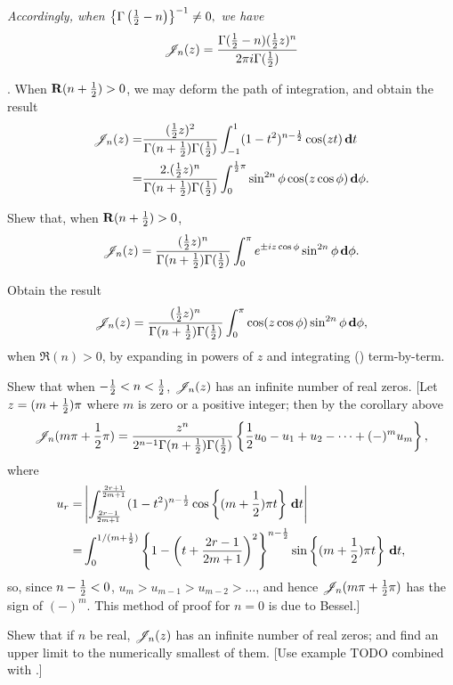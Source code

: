 \emph{Accordingly, when
  $
  \left\{ \Gamma\left( \frac{1}{2}-n \right) \right\}^{-1} \neq 0,
  $
  we have
}
$$
\mathscr{J}_{n}(z)
=
\frac{ \Gamma(\frac{1}{2}-n) (\frac{1}{2} z)^{n} }{ 2\pi i \Gamma(\frac{1}{2})}
$$

\corollary. When $\operatorname{\mathbf{R}}(n+\frac{1}{2}) > 0$, we may deform the path of
integration, and obtain the result
\begin{align*}
  \mathscr{J}_{n}(z)
  =&
  \frac{ (\frac{1}{2} z)^{2} }{ \Gamma(n+\frac{1}{2}) \Gamma(\frac{1}{2}) }
  \int_{-1}^{1} (1-t^{2})^{n-\frac{1}{2}} \cos(zt) \, \mathbf{d} t
  \\
  =&
  \frac{2 . (\frac{1}{2} z)^{n} }{ \Gamma(n+\frac{1}{2}) \Gamma(\frac{1}{2}) }
  \int_{0}^{\frac{1}{2} \pi} \sin^{2n}\phi \cos(z \cos\phi) \, \mathbf{d}\phi.
\end{align*}
\begin{wandwexample}
  Shew that, when $\operatorname{\mathbf{R}}(n+\frac{1}{2}) > 0$,
  $$
  \mathscr{J}_{n}(z)
  =
  \frac{ (\frac{1}{2} z)^{n} }{ \Gamma(n+\frac{1}{2}) \Gamma(\frac{1}{2}) }
  \int_{0}^{\pi} e^{\pm iz\cos\phi} \sin^{2n}\phi \, \mathbf{d}\phi.
  $$
\end{wandwexample}
\begin{wandwexample}
  Obtain the result
  $$
  \mathscr{J}_{n}(z)
  =
  \frac{ (\frac{1}{2} z)^{n} }{ \Gamma(n+\frac{1}{2}) \Gamma(\frac{1}{2}) }
  \int_{0}^{\pi} \cos(z\cos\phi) \sin^{2n}\phi \, \mathbf{d}\phi,
  $$
  when $\Re(n) > 0$, by expanding in powers of $z$ and
  integrating
  () term-by-term.
\end{wandwexample}
% 
% 
\begin{wandwexample}
  Shew that when $-\frac{1}{2} < n < \frac{1}{2}$, $\mathscr{J}_{n}(z)$ has an infinite number
  of real zeros. [Let $z = (m+\frac{1}{2})\pi$ where $m$ is zero or a
  positive integer; then by the corollary above
  $$
  \mathscr{J}_{n}(m\pi + \frac{1}{2}\pi)
  =
  \frac{z^{n}}{2^{n-1} \Gamma(n+\frac{1}{2}) \Gamma(\frac{1}{2})}
  \left\{  \frac{1}{2} u_{0} - u_{1} + u_{2} - \cdots + (-)^{m} u_{m} \right\},
  $$
  where
  \begin{align*}
    u_{r}
    =&
    \left| 
      \int_{\frac{2r-1}{2m+1}}^{\frac{2r+1}{2m+1}}
      (1-t^{2})^{n-\frac{1}{2}} \cos \left\{ (m+\frac{1}{2})\pi t \right\}
      \, \mathbf{d} t
     \right|
    \\
    =&
    \int_{0}^{1/(m+\frac{1}{2})}
    \left\{ 
      1
      -
      \left( t + \frac{2r-1}{2m+1} \right)^{2}
     \right\}^{n-\frac{1}{2}}
    \sin\left\{  (m+\frac{1}{2})\pi t  \right\}
    \, \mathbf{d} t,
  \end{align*}
  so, since $n - \frac{1}{2} < 0$, $u_{m} > u_{m-1} > u_{m-2} > \ldots$, and
  hence $\mathscr{J}_{n}(m\pi + \frac{1}{2}\pi)$ has the sign of $(-)^{m}$.
  This method of proof for $n=0$ is due to Bessel.]
\end{wandwexample}
\begin{wandwexample}
  Shew that if $n$ be real, $\mathscr{J}_{n}(z)$ has an infinite number of real
  zeros; and find an upper limit to the numerically smallest of them.
  [Use example TODO combined with .]
\end{wandwexample}

